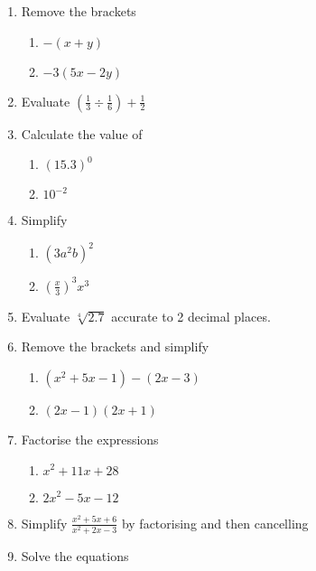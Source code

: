 \begin{enumerate}
	\item Remove the brackets 
	\begin{enumerate}
		\item $ -\left (x +y\right )$ 
		\item $ -3 (5 x -2 y)$ \end{enumerate}
	
	\item Evaluate $\left (\frac{1}{3} \div \frac{1}{6}\right ) +\frac{1}{2}$ 
	
	\item Calculate the value of 
	\begin{enumerate}
		\item $\left (15.3\right )^{0}$ 
		\item $10^{ -2}$ \end{enumerate}
	\item Simplify 
	\begin{enumerate}
		\item $\left (3 a^{2} b\right )^{2}$ 
		
		\item $\genfrac{(}{)}{}{}{x}{3}^{3} x^{3}$ \end{enumerate}
	
	
	\item Evaluate $\sqrt[{4}]{2.7}$ accurate to 2 decimal places. 
	
	\item Remove the brackets and simplify 
	
	
	\begin{enumerate}
		\item $\left (x^{2} +5 x -1\right ) -\left (2 x -3\right )$ 
		
		\item $\left (2 x -1\right ) \left (2 x +1\right )$ \end{enumerate}
	
	
	\item Factorise the expressions 
	\begin{enumerate}
		\item $x^{2} +11 x +28$ 	
		\item $2 x^{2} -5 x -12$ 
		\end{enumerate}
	\item Simplify $\frac{x^{2} +5 x +6}{x^{2} +2 x -3}$ by factorising and then cancelling 
	
	\item Solve the equations 
	

\end{enumerate}
